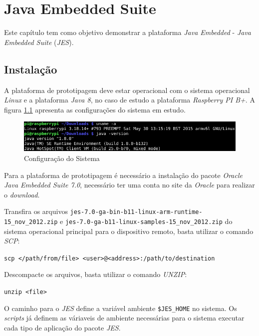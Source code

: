 %

\chapter{Java Embedded Suite}

Este capítulo tem como objetivo demonstrar a plataforma \textit{Java Embedded}
- \textit{Java Embedded Suite} (\textit{JES}).

\section{Instalação}

A plataforma de prototipagem deve estar operacional com o sistema operacional
\textit{Linux} e a plataforma \textit{Java 8}, no caso de estudo a plataforma
\textit{Raspberry PI B+}. A figura \ref{fig:jes/configuracao} apresenta as
configurações do sistema em estudo.

\begin{figure}[H]
    \centering
    \includegraphics[width=0.7\linewidth]{figuras/java/configuracao}
    \caption{Configuração do Sistema}
    \label{fig:jes/configuracao}
\end{figure}

Para a plataforma de prototipagem é necessário a instalação do pacote
\textit{Oracle Java Embedded Suite 7.0}, necessário ter uma conta no site da
\textit{Oracle} para realizar o \textit{download}.

Transfira os arquivos \newline
\verb|jes-7.0-ga-bin-b11-linux-arm-runtime-15_nov_2012.zip|
 e \newline
\verb|jes-7.0-ga-b11-linux-samples-15_nov_2012.zip|
 do sistema operacional principal para o dispositivo remoto, basta
utilizar o comando \textit{SCP}:

\verb|scp </path/from/file> <user>@<address>:/path/to/destination|

Descompacte os arquivos, basta utilizar o comando \textit{UNZIP}:

\verb|unzip <file>|

O caminho para o \textit{JES} define a variável ambiente
\verb|$JES_HOME| no sistema. Os \textit{scripts} já definem as váriaveis de
ambiente necessárias para o sistema executar cada tipo de aplicação do pacote
\textit{JES}.


